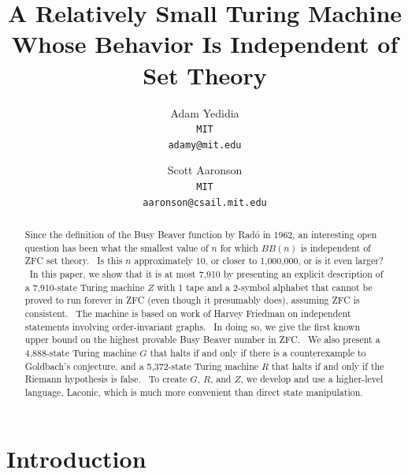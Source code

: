 \documentclass[11pt]{article}
\newcommand{\statenumstate}{7,910-state }
\newcommand{\statenum}{7,910 }
\newcommand{\gbstatenumstate}{4,888-state }
\newcommand{\rmstatenumstate}{5,372-state }
\begin{document}
\title{A Relatively Small Turing Machine Whose Behavior Is Independent of Set Theory}
\author{
    Adam Yedidia\\
    \small\texttt{MIT}\\
    \small\texttt{adamy@mit.edu}
    \and
    Scott Aaronson\\
    \small\texttt{MIT}\\
    \small\texttt{aaronson@csail.mit.edu}
}
\maketitle

\begin{abstract}

Since the definition of the Busy Beaver function by Rad\'{o} in 1962, an interesting open question has been what the smallest value of $n$ for which $BB(n)$ is independent of ZFC set theory. \ Is this $n$ approximately $10$, or closer to 1,000,000, or is it even larger? \ In this paper, we show that it is at most \statenum by presenting an explicit description of a \statenumstate Turing machine $Z$ with 1 tape and a 2-symbol alphabet that cannot be proved to run forever in ZFC (even though it presumably does), assuming ZFC is consistent. \ The machine is based on work of Harvey Friedman on independent statements involving order-invariant graphs. \ In doing so, we give the first known upper bound on the highest provable Busy Beaver number in ZFC. \ We also present a \gbstatenumstate Turing machine $G$ that halts if and only if there is a counterexample to Goldbach's conjecture, and a \rmstatenumstate Turing machine $R$ that halts if and only if the Riemann hypothesis is false. \ To create $G$, $R$, and $Z$, we develop and use a higher-level language, Laconic, which is much more convenient than direct state manipulation.

\end{abstract}

\section{Introduction}

\end{document}

